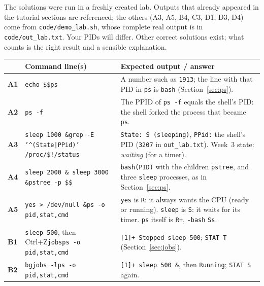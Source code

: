 \documentclass[11pt,a4paper]{article}
\newcommand{\cmd}[1]{\texttt{#1}}
\begin{document}
The solutions were run in a freshly created lab. Outputs that already appeared in the tutorial sections are referenced; the others (A3, A5, B4, C3, D1, D3, D4) come from \texttt{code/demo\_lab.sh}, whose complete real output is in \texttt{code/out\_lab.txt}. Your PIDs will differ. Other correct solutions exist; what counts is the right result and a sensible explanation.

{\footnotesize
\renewcommand{\arraystretch}{1.2}
\begin{longtable}{@{}p{0.6cm}>{\raggedright\arraybackslash}p{7.3cm}>{\raggedright\arraybackslash}p{7.6cm}@{}}
\toprule
& \textbf{Command line(s)} & \textbf{Expected output / answer}\\
\midrule
\endhead
\textbf{A1} & \texttt{echo \$\$}\newline \texttt{ps} & A number such as \texttt{1913}; the line with that PID in \cmd{ps} is \texttt{bash} (Section~\ref{sec:ps}).\\
\textbf{A2} & \texttt{ps -f} & The PPID of \texttt{ps -f} equals the shell's PID: the shell forked the process that became \cmd{ps}.\\
\textbf{A3} & \texttt{sleep 1000 \&}\newline \texttt{grep -E '\textasciicircum(State|PPid)' /proc/\$!/status} & \texttt{State: S (sleeping)}, \texttt{PPid:} the shell's PID (\texttt{3207} in \texttt{out\_lab.txt}). Week~3 state: \emph{waiting} (for a timer).\\
\textbf{A4} & \texttt{sleep 2000 \& sleep 3000 \&}\newline \texttt{pstree -p \$\$} & \texttt{bash(PID)} with the children \texttt{pstree}, and three \texttt{sleep} processes, as in Section~\ref{sec:ps}.\\
\textbf{A5} & \texttt{yes > /dev/null \&}\newline \texttt{ps -o pid,stat,cmd} & \texttt{yes} is \texttt{R}: it always wants the CPU (ready or running). \texttt{sleep} is \texttt{S}: it waits for its timer. \texttt{ps} itself is \texttt{R+}, \texttt{-bash} \texttt{Ss}.\\
\textbf{B1} & \texttt{sleep 500}, then Ctrl+Z\newline \texttt{jobs}\newline \texttt{ps -o pid,stat,cmd} & \texttt{[1]+ Stopped sleep 500}; \texttt{STAT T} (Section~\ref{sec:jobs}).\\
\textbf{B2} & \texttt{bg}\newline \texttt{jobs -l}\newline \texttt{ps -o pid,stat,cmd} & \texttt{[1]+ sleep 500 \&}, then \texttt{Running}; \texttt{STAT S} again.\\

\end{longtable}}
\end{document}
